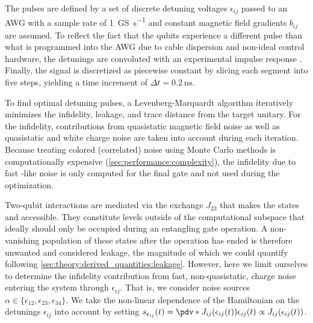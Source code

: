 The pulses are defined by a set of discrete detuning voltages $\epsilon_{ij}$ passed to an AWG with a sample rate of \SI{1}{\giga S\per\second} and constant magnetic field gradients $b_{ij}$ are assumed. To reflect the fact that the qubits experience a different pulse than what is programmed into the AWG due to cable dispersion and non-ideal control hardware, the detunings are convoluted with an experimental impulse response \cite{Cerfontaine2019}. Finally, the signal is discretized as piecewise constant by slicing each segment into five steps, yielding a time increment of $\Delta t = \SI{0.2}{\nano\second}$.

To find optimal detuning pulses, a Levenberg-Marquardt algorithm iteratively minimizes the infidelity, leakage, and trace distance from the target unitary. For the infidelity, contributions from quasistatic magnetic field noise as well as quasistatic and white charge noise are taken into account during each iteration. Because treating colored (correlated) noise using Monte Carlo methods is computationally expensive (\cf \cref{sec:performance:complexity}), the infidelity due to fast \oneoverf-like noise is only computed for the final gate and not used during the optimization.

Two-qubit interactions are mediated via the exchange $J_{23}$ that makes the states \ketuudd and \ketdduu accessible. They constitute levels outside of the computational subspace that ideally should only be occupied during an entangling gate operation. A non-vanishing population of these states after the operation has ended is therefore unwanted and considered leakage, the magnitude of which we could quantify following \cref{sec:theory:derived_quantities:leakage}. However, here we limit ourselves to determine the infidelity contribution from fast, \viz non-quasistatic, charge noise entering the system through $\epsilon_{ij}$. That is, we consider noise sources $\alpha\in\lbrace\epsilon_{12},\epsilon_{23},\epsilon_{34}\rbrace$. We take the non-linear dependence of the Hamiltonian on the detunings $\epsilon_{ij}$ into account by setting $s_{\epsilon_{ij}}(t) = \pdv*{J_{ij}(\epsilon_{ij}(t))}{\epsilon_{ij}(t)}\propto J_{ij}(\epsilon_{ij}(t))$.

